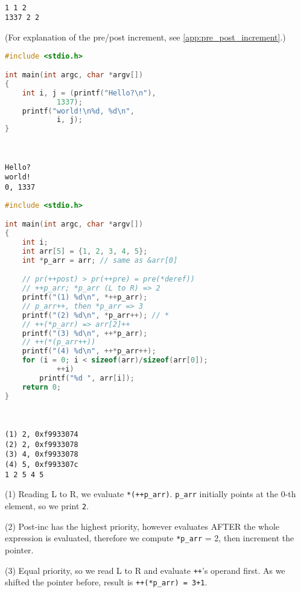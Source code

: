 \documentclass[a4paper]{article}
\begin{document}
\begin{exmp}
\begin{multicols}{2}
\columnbreak
\; \\
\begin{verbatim}
1 1 2
1337 2 2
\end{verbatim}
(For explanation of the pre/post increment, see \ref{app:pre_post_increment}.)

\end{multicols}

\begin{multicols}{2}
\begin{lstlisting}[language=c]
#include <stdio.h>

int main(int argc, char *argv[])
{
	int i, j = (printf("Hello?\n"),
			1337);
	printf("world!\n%d, %d\n",
			i, j);
}
\end{lstlisting}
\columnbreak
\; \\
\begin{verbatim}
Hello?
world!
0, 1337
\end{verbatim}
\end{multicols}


\begin{multicols}{2}
\begin{lstlisting}[language=c]
#include <stdio.h>

int main(int argc, char *argv[])
{
	int i;
	int arr[5] = {1, 2, 3, 4, 5};
	int *p_arr = arr; // same as &arr[0]

	// pr(++post) > pr(++pre) = pre(*deref))
	// ++p_arr; *p_arr (L to R) => 2
	printf("(1) %d\n", *++p_arr);
	// p_arr++, then *p_arr => 3
	printf("(2) %d\n", *p_arr++); // *
	// ++(*p_arr) => arr[2]++
	printf("(3) %d\n", ++*p_arr);
	// ++(*(p_arr++))
	printf("(4) %d\n", ++*p_arr++);
	for (i = 0; i < sizeof(arr)/sizeof(arr[0]);
			++i)
		printf("%d ", arr[i]);
	return 0;
}
\end{lstlisting}

\columnbreak
\; \\
\begin{verbatim}
(1) 2, 0xf9933074
(2) 2, 0xf9933078
(3) 4, 0xf9933078
(4) 5, 0xf993307c
1 2 5 4 5
\end{verbatim}

(1) Reading L to R, we evaluate \texttt{*(++p\_arr)}. \texttt{p\_arr} initially points at the 0-th element, so we print \texttt{2}.

(2) Post-inc has the highest priority, however evaluates AFTER the whole expression is evaluated, therefore we compute \texttt{*p\_arr} = 2, then increment the pointer.

(3) Equal priority, so we read L to R and evaluate \texttt{++}'s operand first. As we shifted the pointer before, result is \texttt{++(*p\_arr) = 3+1}. 


\end{multicols}
\end{exmp}
\end{document}

